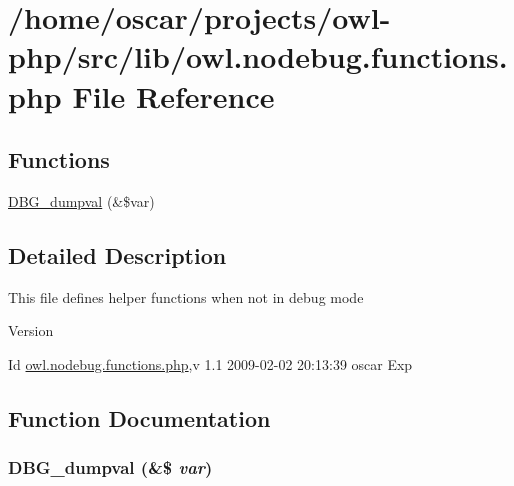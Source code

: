 \section{/home/oscar/projects/owl-\/php/src/lib/owl.nodebug.functions.php File Reference}
\label{owl_8nodebug_8functions_8php}
\subsection*{Functions}
\begin{DoxyCompactItemize}
\item 
\hyperlink{owl_8nodebug_8functions_8php_a65a2d146de0c2b3a89eb4c118a88905f}{DBG\_\-dumpval} (\&\$var)
\end{DoxyCompactItemize}


\subsection{Detailed Description}
This file defines helper functions when not in debug mode \begin{DoxyVersion}{Version}

\end{DoxyVersion}
\begin{DoxyParagraph}{Id}
\hyperlink{owl_8nodebug_8functions_8php}{owl.nodebug.functions.php},v 1.1 2009-\/02-\/02 20:13:39 oscar Exp 
\end{DoxyParagraph}


\subsection{Function Documentation}
\subsubsection[{DBG\_\-dumpval}]{\setlength{\rightskip}{0pt plus 5cm}DBG\_\-dumpval (\&\$ {\em var})}\label{owl_8nodebug_8functions_8php_a65a2d146de0c2b3a89eb4c118a88905f}
